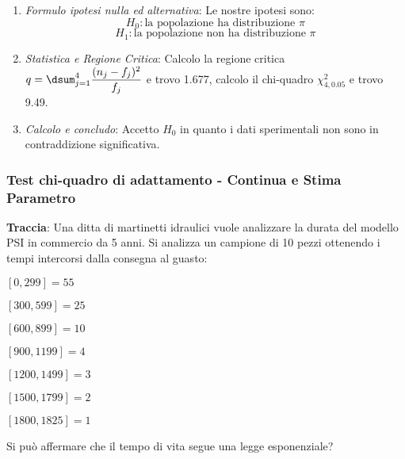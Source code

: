\begin{enumerate}
    \item \textit{Formulo ipotesi nulla ed alternativa}: Le nostre ipotesi sono: $$H_0: \text{la popolazione ha distribuzione } \pi$$ $$H_1: \text{la popolazione non ha distribuzione }\pi$$
    \item \textit{Statistica e Regione Critica}: Calcolo la regione critica $q=\dsum_{j=1}^4 \dfrac{(n_j - f_j)^2}{f_j}$ e trovo 1.677, calcolo il chi-quadro $\chi^2_{4, 0.05}$ e trovo 9.49.
    \item \textit{Calcolo e concludo}: Accetto $H_0$ in quanto i dati sperimentali non sono in contraddizione significativa.
\end{enumerate}

\subsubsection{Test chi-quadro di adattamento - Continua e Stima Parametro}

\textbf{Traccia}: Una ditta di martinetti idraulici vuole analizzare la durata del modello PSI in commercio da 5 anni. Si analizza un campione di 10 pezzi ottenendo i tempi intercorsi dalla consegna al guasto:
\begin{center}
    \item $[0,299] = 55 $
    \item $[300, 599] = 25 $
    \item $[600, 899] = 10$ 
    \item $[900, 1199] = 4$
    \item $[1200, 1499] = 3$ 
    \item $[1500, 1799] = 2$ 
    \item $[1800, 1825] = 1$ 
\end{center}
Si può affermare che il tempo di vita segue una legge esponenziale?

